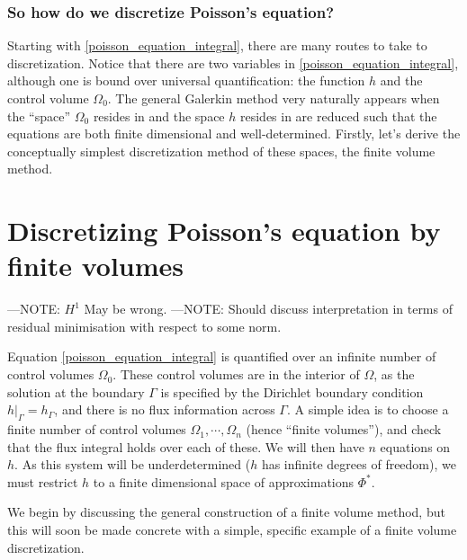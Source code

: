 \subsubsection{So how do we discretize Poisson's equation?}
Starting with \eqref{poisson_equation_integral}, there are many routes to take to discretization.
Notice that there are two variables in \eqref{poisson_equation_integral}, although one is bound over universal quantification:
the function $h$ and the control volume $\Omega_0$.
The general Galerkin method very naturally appears when the ``space'' $\Omega_0$ resides in and the space $h$ resides in are reduced
such that the equations are both finite dimensional and well-determined. Firstly, let's derive the conceptually simplest
discretization method of these spaces, the finite volume method.


\section{Discretizing Poisson's equation by finite volumes}\label{discretizing_poisson}
---NOTE: $H^1$ May be wrong.
---NOTE: Should discuss interpretation in terms of residual minimisation with respect to some norm.
\vskip 0.5in

Equation \eqref{poisson_equation_integral} is quantified over an infinite number of control volumes $\Omega_0$.
These control volumes are in the interior of $\Omega$, as the solution at the boundary $\Gamma$ is specified by the Dirichlet boundary condition
$\left.h\right|_\Gamma = h_\Gamma$, and there is no flux information across $\Gamma$.
A simple idea is to choose a finite number of control volumes $\Omega_1,\cdots,\Omega_n$ (hence ``finite volumes''), and check that the flux integral holds over each of these.
We will then have $n$ equations on $h$. As this system will be underdetermined ($h$ has infinite degrees of freedom), we must
restrict $h$ to a finite dimensional space of approximations $\Phi^*$.

We begin by discussing the general construction of a finite volume method, but this will soon be made concrete with a simple, specific example of a 
finite volume discretization.



